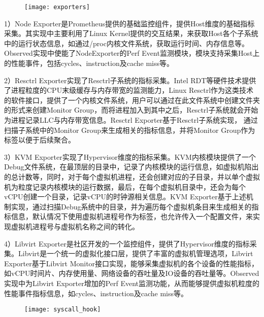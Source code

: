 \begin{figure}[!htbp]
    \centering
    \texttt{[image: exporters]}
    \label{fig:exporters} 
\end{figure}

1）Node Exporter是Prometheus提供的基础监控组件，提供Host维度的基础指标采集。其实现中主要利用了Linux Kernel提供的交互结果，来获取Host各个子系统中的运行状态信息，如通过/proc内核文件系统，获取运行时间、内存信息等。Observed实现中使能了NodeExporter的Perf Event监测模块，模块支持采集Host上的性能事件，包括cycles、instruction及cache miss等。

2）Resctrl Exporter实现了Resctrl子系统的指标采集。Intel RDT等硬件技术提供了进程粒度的CPU末级缓存与内存带宽的监测能力，Linux Resctrl作为这类技术的软件接口，提供了一个内核文件系统，用户可以通过在此文件系统中创建文件夹的形式来创建Monitor Group，而将进程加入到其中之后，Resctrl子系统就会开始为进程记录LLC与内存带宽信息。Resctrl Exporter基于Resctrl子系统实现， 通过扫描子系统中的Monitor Group来生成相关的指标信息，并将Monitor Group作为标签以便于后续聚合。

3）KVM Exporter实现了Hypervisor维度的指标采集。KVM内核模块提供了一个Debug文件系统，在最顶层的目录中，记录了内核模块的运行信息，如虚拟机陷出的总计数等，同时，对于每个虚拟机进程，还会创建对应的子目录，并以单个虚拟机为粒度记录内核模块的运行数据，最后，在每个虚拟机目录中，还会为每个vCPU创建一个目录，记录vCPU的时钟源相关信息。KVM Exporter基于上述机制实现，通过扫描Debug系统中的目录，并为遍历每个虚拟机条目来生成相关的指标信息，默认情况下使用虚拟机进程号作为标签，也允许传入一个配置文件，来实现虚拟机进程号与虚拟机名称之间的转化。

4）Libvirt Exporter是社区开发的一个监控组件，提供了Hypervisor维度的指标采集。Libvirt是一个统一的虚拟化接口层，提供了丰富的虚拟机管理选项，Libvirt Exporter基于Libvirt Monitor接口实现，能够采集虚拟机的各个设备的性能指标，如vCPU时间片、内存使用量、网络设备的吞吐量及IO设备的吞吐量等。Observed实现中为Libvirt Exporter增加的Perf Event监测功能，从而能够提供虚拟机粒度的性能事件指标信息，如cycles、instruction及cache miss等。

\begin{figure}[!htbp]
    \centering
    \texttt{[image: syscall\_hook]}
    \label{fig:syscall_hook}
\end{figure}

